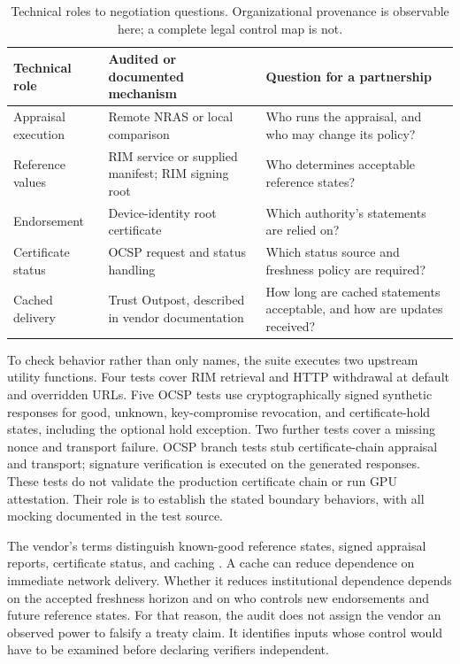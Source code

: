 \documentclass[11pt,letterpaper]{article}
\begin{document}
\begin{table}[ht]
\centering\small
\begin{tabular}{p{.21\linewidth}p{.33\linewidth}p{.36\linewidth}}
\toprule
Technical role & Audited or documented mechanism & Question for a partnership \\
\midrule
Appraisal execution & Remote NRAS or local comparison & Who runs the appraisal, and who may change its policy? \\
Reference values & RIM service or supplied manifest; RIM signing root & Who determines acceptable reference states? \\
Endorsement & Device-identity root certificate & Which authority's statements are relied on? \\
Certificate status & OCSP request and status handling & Which status source and freshness policy are required? \\
Cached delivery & Trust Outpost, described in vendor documentation & How long are cached statements acceptable, and how are updates received? \\
\bottomrule
\end{tabular}
\caption{Technical roles to negotiation questions. Organizational provenance is observable here; a complete legal control map is not.}\label{tab:roles}
\end{table}

To check behavior rather than only names, the suite executes two upstream utility functions. Four tests cover RIM retrieval and HTTP withdrawal at default and overridden URLs. Five OCSP tests use cryptographically signed synthetic responses for good, unknown, key-compromise revocation, and certificate-hold states, including the optional hold exception. Two further tests cover a missing nonce and transport failure. OCSP branch tests stub certificate-chain appraisal and transport; signature verification is executed on the generated responses. These tests do not validate the production certificate chain or run GPU attestation. Their role is to establish the stated boundary behaviors, with all mocking documented in the test source.

The vendor's terms distinguish known-good reference states, signed appraisal reports, certificate status, and caching \citep{nterms}. A cache can reduce dependence on immediate network delivery. Whether it reduces institutional dependence depends on the accepted freshness horizon and on who controls new endorsements and future reference states. For that reason, the audit does not assign the vendor an observed power to falsify a treaty claim. It identifies inputs whose control would have to be examined before declaring verifiers independent.
\end{document}

